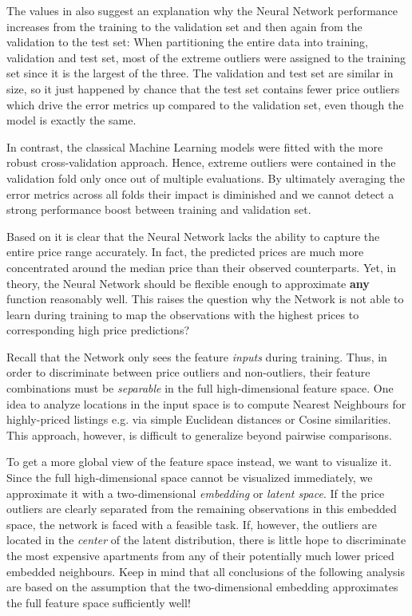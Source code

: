 The values in  also suggest an explanation why the Neural Network performance increases from the training to the validation set and then again from the validation to the test set:
When partitioning the entire data into training, validation and test set, most of the extreme outliers were assigned to the training set since it is the largest of the three.
The validation and test set are similar in size, so it just happened by chance that the test set contains fewer price outliers which drive the error metrics up compared to the validation set, even though the model is exactly the same.

In contrast, the classical Machine Learning models were fitted with the more robust cross-validation approach.
Hence, extreme outliers were contained in the validation fold only once out of multiple evaluations.
By ultimately averaging the error metrics across all folds their impact is diminished and we cannot detect a strong performance boost between training and validation set.

Based on  it is clear that the Neural Network lacks the ability to capture the entire price range accurately.
In fact, the predicted prices are much more concentrated around the median price than their observed counterparts.
Yet, in theory, the Neural Network should be flexible enough to approximate \textbf{any} function reasonably well.
This raises the question why the Network is not able to learn during training to map the observations with the highest prices to corresponding high price predictions?

Recall that the Network only sees the feature \emph{inputs} during training.
Thus, in order to discriminate between price outliers and non-outliers, their feature combinations must be \emph{separable} in the full high-dimensional feature space.
One idea to analyze locations in the input space is to compute Nearest Neighbours for highly-priced listings e.g. via simple Euclidean distances or Cosine similarities.
This approach, however, is difficult to generalize beyond pairwise comparisons.

To get a more global view of the feature space instead, we want to visualize it.
Since the full high-dimensional space cannot be visualized immediately, we approximate it with a two-dimensional \emph{embedding} or \emph{latent space}.
If the price outliers are clearly separated from the remaining observations in this embedded space, the network is faced with a feasible task.
If, however, the outliers are located in the \emph{center} of the latent distribution, there is little hope to discriminate the most expensive apartments from any of their potentially much lower priced embedded neighbours.
Keep in mind that all conclusions of the following analysis are based on the assumption that the two-dimensional embedding approximates the full feature space sufficiently well!

